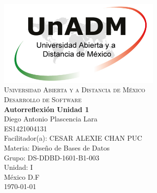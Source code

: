 \documentclass[spanish,12pt,letterpapper]{article}
\begin{document}
	\begin{titlepage}
		\begin{center}
			\includegraphics[width=0.6\textwidth]{../logoUnADM}~\\[1cm] 
			\textsc{Universidad Abierta y a Distancia de México}\\[0.8cm]
			\textsc{Desarrollo de Software}\\[1.8cm]
			
			\textbf{ \Large Autorreflexión Unidad 1}\\[3cm]
			
			Diego Antonio Plascencia Lara\\ ES1421004131 \\[0.4cm]
			Facilitador(a): CESAR ALEXIE CHAN PUC  \\
			Materia: Diseño de Bases de Datos\\
			Grupo: DS-DDBD-1601-B1-003 \\
			Unidad: I \\
			
			\vfill México D.F\\{\today}
			
		\end{center}
	\end{titlepage}
	
\end{document}
